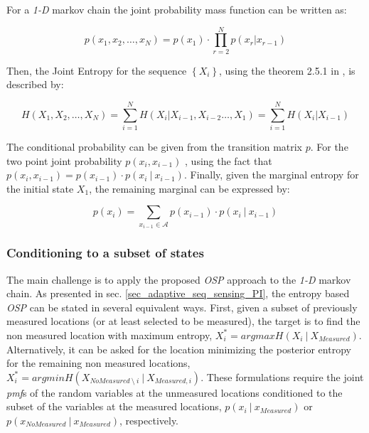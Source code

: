 For a \emph{1-D} markov chain the joint probability mass function can be written as:

\begin{equation}
\label{eq:Markov_PMF}
	p(x_{1},x_{2},\ldots,x_{N}) = p(x_{1}) \cdot \prod_{r=2}^{N}{p(x_{r} | x_{r-1})}
\end{equation}

Then, the Joint Entropy for the sequence $\left\{ X_{i} \right\}$, using the theorem 2.5.1 in \cite{cover_2006}, is described by:

\begin{equation}
\label{eq:Markov_JointH}
	H(X_{1},X_{2}, \ldots , X_{N}) = \sum_{i=1}^{N}{H(X_{i} | X_{i-1}, X_{i-2} \ldots , X_{1})} =  \sum_{i=1}^{N}{H(X_{i} | X_{i-1})}
\end{equation}

The conditional probability can be given from the transition matrix $p$. For the two point joint probability $p(x_{i},x_{i-1})$ , using the fact that $p(x_{i},x_{i-1}) = p(x_{i-1}) \cdot p(x_{i} \ | \ x_{i-1})$. Finally, given the marginal entropy for the initial state $X_{1}$, the remaining marginal can be expressed by:

\begin{equation}
\label{eq:Markov_marginalP}
	p(x_{i}) = \sum_{x_{i-1} \in \mathcal{A}}{ p(x_{i-1}) \cdot p(x_{i} \ |  \ x_{i-1}) }
\end{equation}

\subsubsection{Conditioning to a subset of states}

The main challenge is to apply the proposed \emph{OSP} approach to the \emph{1-D} markov chain. As presented in sec. \ref{sec_adaptive_seq_sensing_PI}, the entropy based \emph{OSP} can be stated in several equivalent ways. First, given a subset of previously measured locations (or at least selected to be measured), the target is to find the non measured location with maximum entropy, $X^{*}_{i} = argmax H(X_{i} \ | \  X_{Measured})$. Alternatively, it can be asked for the location minimizing the posterior entropy for the remaining non measured locations, $X^{*}_{i} = argmin H(X_{NoMeasured \ \setminus \ i} \ | \ X_{Measured, i}) $. These formulations require the joint \emph{pmf}s of the random variables at the unmeasured locations conditioned to the subset of the variables at the measured locations, $p( x_{i} \ | \  x_{Measured})$  or $p( x_{NoMeasured} \ | \  x_{Measured})$,  respectively.


